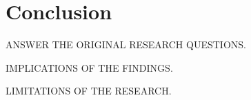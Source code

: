 \chapter{Conclusion}
\label{ch:conclusion}

ANSWER THE ORIGINAL RESEARCH QUESTIONS.

IMPLICATIONS OF THE FINDINGS.

LIMITATIONS OF THE RESEARCH.
